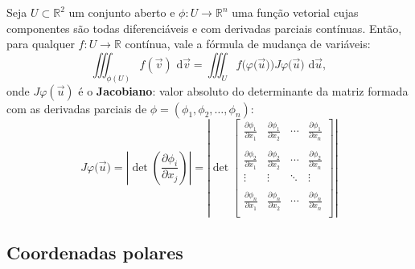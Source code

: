 \begin{teo}
Seja $U \subset \mathbb{R}^2$ um conjunto aberto e $\phi: U \to \mathbb{R}^n$ uma função vetorial cujas componentes são todas diferenciáveis e com derivadas parciais contínuas. Então, para qualquer $f: U \to \mathbb{R}$ contínua, vale a fórmula de mudança de variáveis:
\begin{equation}
\iiint_{\phi (U)}  f(\vec{v}) \, \, \mathrm{d} \vec{v} =  \iiint _{U} f\big(\varphi \big(\vec{u}\big)\big) J\varphi \big(\vec{u}\big) \, \, \mathrm{d}\vec{u},
\end{equation} onde $J\varphi (\vec{u})$ é o \textbf{Jacobiano}: valor absoluto do determinante da matriz formada com as derivadas parciais de $\phi = (\phi_1, \phi_2, \dots, \phi_n)$:
\begin{equation}
J\varphi \big(\vec{u}\big) = \left|
\det \left( \frac{\partial \phi_i}{\partial x_j} \right)
\right| = \left|
\det
\begin{bmatrix}
\frac{\partial \phi_1}{\partial x_1} & \frac{\partial \phi_1}{\partial x_2} & \cdots & \frac{\partial \phi_1}{\partial x_n} \\
 &&& \\
\frac{\partial \phi_2}{\partial x_1} & \frac{\partial \phi_2}{\partial x_2} & \cdots & \frac{\partial \phi_2}{\partial x_n} \\
\vdots & \vdots & \ddots & \vdots \\
 &&& \\
\frac{\partial \phi_n}{\partial x_1} & \frac{\partial \phi_n}{\partial x_2} & \cdots & \frac{\partial \phi_n}{\partial x_n} \\
\end{bmatrix}
\right|
\end{equation}
\end{teo}


\subsection{Coordenadas polares}

